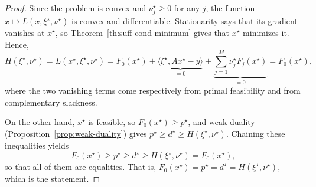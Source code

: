 
     \begin{proof}
         Since the problem is convex and $\nu_j^\star\ge 0$ for any $j$, the function $x\mapsto L(x,\xi^\star,\nu^\star)$ is convex and differentiable. Stationarity says that its gradient vanishes at $x^\star$, so Theorem~\ref{th:suff-cond-minimum} gives that $x^\star$ minimizes it. Hence,
         \begin{equation}
             H(\xi^\star,\nu^\star)
             = L(x^\star,\xi^\star,\nu^\star)
             = F_0(x^\star) + \underbrace{\langle \xi^\star, Ax^\star-y\rangle}_{=0}
             + \underbrace{\sum_{j=1}^M \nu_j^\star F_j(x^\star)}_{=0}
             = F_0(x^\star),
         \end{equation}
         where the two vanishing terms come respectively from primal feasibility and from complementary slackness.

         On the other hand, $x^\star$ is feasible, so $F_0(x^\star)\ge p^\star$, and weak duality (Proposition~\ref{prop:weak-duality}) gives $p^\star\ge d^\star \ge H(\xi^\star,\nu^\star)$. Chaining these inequalities yields
         \begin{equation}
             F_0(x^\star)\ge p^\star \ge d^\star \ge H(\xi^\star,\nu^\star) = F_0(x^\star),
         \end{equation}
         so that all of them are equalities. That is, $F_0(x^\star)=p^\star=d^\star=H(\xi^\star,\nu^\star)$, which is the statement.
     \end{proof}


